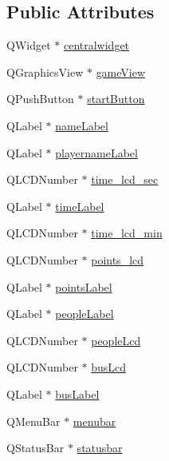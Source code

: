 \subsection*{Public Attributes}
\begin{DoxyCompactItemize}
\item 
Q\-Widget $\ast$ \hyperlink{class_ui___main_window_a356f1cf3ebda15f1fac59467ee081b74}{centralwidget}
\item 
Q\-Graphics\-View $\ast$ \hyperlink{class_ui___main_window_ae663973f203ce9ab1eeb16a5f447f01b}{game\-View}
\item 
Q\-Push\-Button $\ast$ \hyperlink{class_ui___main_window_a58a84cd3057ab5459819f986b08942b1}{start\-Button}
\item 
Q\-Label $\ast$ \hyperlink{class_ui___main_window_a134047926bc9eaff33275117ccbc9c21}{name\-Label}
\item 
Q\-Label $\ast$ \hyperlink{class_ui___main_window_a8108589cee0e2111790181434554d5e1}{playername\-Label}
\item 
Q\-L\-C\-D\-Number $\ast$ \hyperlink{class_ui___main_window_aae00401f91a31bfd7c9c7a7cee380470}{time\-\_\-lcd\-\_\-sec}
\item 
Q\-Label $\ast$ \hyperlink{class_ui___main_window_a1c286339fffe4e58accecda69001e9f5}{time\-Label}
\item 
Q\-L\-C\-D\-Number $\ast$ \hyperlink{class_ui___main_window_a390cfc326ededa1ee82c3b060e54b9f6}{time\-\_\-lcd\-\_\-min}
\item 
Q\-L\-C\-D\-Number $\ast$ \hyperlink{class_ui___main_window_aadc178326d913f4a3278657e4cde7ec6}{points\-\_\-lcd}
\item 
Q\-Label $\ast$ \hyperlink{class_ui___main_window_a8e83ba27be2971366897c2a1384d00a7}{points\-Label}
\item 
Q\-Label $\ast$ \hyperlink{class_ui___main_window_a8a23892e3dfd6fb1915c36dc3cbedeb7}{people\-Label}
\item 
Q\-L\-C\-D\-Number $\ast$ \hyperlink{class_ui___main_window_af83ee7f5b0f81925e4b6050ac03786a5}{people\-Lcd}
\item 
Q\-L\-C\-D\-Number $\ast$ \hyperlink{class_ui___main_window_aa5a21b4a3f6c07e5a7966c453ded132c}{bus\-Lcd}
\item 
Q\-Label $\ast$ \hyperlink{class_ui___main_window_ad6aa0aabd2b7ea587a730d7507eb3a33}{bus\-Label}
\item 
Q\-Menu\-Bar $\ast$ \hyperlink{class_ui___main_window_adf43d9a67adaec750aaa956b5e082f09}{menubar}
\item 
Q\-Status\-Bar $\ast$ \hyperlink{class_ui___main_window_a1687cceb1e2787aa1f83e50433943a91}{statusbar}
\end{DoxyCompactItemize}


